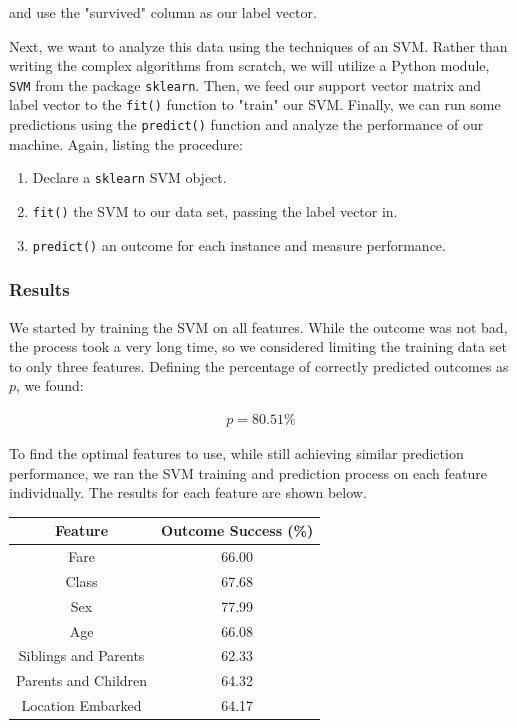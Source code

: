 \documentclass[11pt,a4paper]{article}
\begin{document}
and use the "survived" column as our label vector.

Next, we want to analyze this data using the techniques of an SVM. Rather than writing the complex algorithms from scratch, we will utilize a Python module, \verb|SVM| from the package \verb|sklearn|. Then, we feed our support vector matrix and label vector to the \verb|fit()| function to "train" our SVM. Finally, we can run some predictions using the \verb|predict()| function and analyze the performance of our machine. Again, listing the procedure:

\begin{enumerate}
\item Declare a \verb|sklearn| SVM object.
\item \verb|fit()| the SVM to our data set, passing the label vector in.
\item \verb|predict()| an outcome for each instance and measure performance.
\end{enumerate}

\subsubsection{Results}
We started by training the SVM on all features. While the outcome was not bad, the process took a very long time, so we considered limiting the training data set to only three features. Defining the percentage of correctly predicted outcomes as $p$, we found:

\begin{align*}
p = 80.51\%
\end{align*}

To find the optimal features to use, while still achieving similar prediction performance, we ran the SVM training and prediction process on each feature individually. The results for each feature are shown below.

\begin{center}
 \begin{tabular}{||c | c||} 
 \hline
 Feature & Outcome Success (\%) \\ [0.5ex] 
 \hline\hline
 Fare & 66.00 \\ 
 \hline
 Class & 67.68 \\
 \hline
 Sex & 77.99 \\
 \hline
 Age & 66.08 \\
 \hline
 Siblings and Parents & 62.33 \\
 \hline
 Parents and Children & 64.32 \\
 \hline
 Location Embarked & 64.17 \\ [1ex] 
 \hline
\end{tabular}
\end{center}
\end{document}
